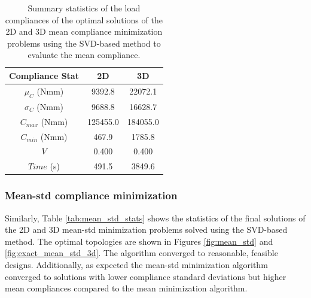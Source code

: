       \begin{table}[h!]
       \centering
       \caption{Summary statistics of the load compliances of the optimal solutions of the 2D and 3D mean compliance minimization problems using the SVD-based method to evaluate the mean compliance.}
       \begin{tabular}{|c|c|c|}
        \hline
        Compliance Stat & 2D & 3D \\
        \hline
        \hline
        $\mu_C$ (Nmm) & 9392.8 & 22072.1 \\
        \hline
        $\sigma_C$ (Nmm) & 9688.8 & 16628.7 \\
        \hline
        $C_{max}$ (Nmm) & 125455.0 & 184055.0 \\
        \hline
        $C_{min}$ (Nmm) & 467.9 & 1785.8 \\
        \hline
        $V$ & 0.400 & 0.400 \\
        \hline
        $Time$ (s) & 491.5 & 3849.6 \\
        \hline
       \end{tabular}
       \label{tab:mean_stats}
      \end{table}

    \subsubsection{Mean-std compliance minimization}

      Similarly, Table \ref{tab:mean_std_stats} shows the statistics of the final solutions of the 2D and 3D mean-std minimization problems solved using the SVD-based method. The optimal topologies are shown in Figures \ref{fig:mean_std} and \ref{fig:exact_mean_std_3d}. The algorithm converged to reasonable, feasible designs. Additionally, as expected the mean-std minimization algorithm converged to solutions with lower compliance standard deviations but higher mean compliances compared to the mean minimization algorithm.

